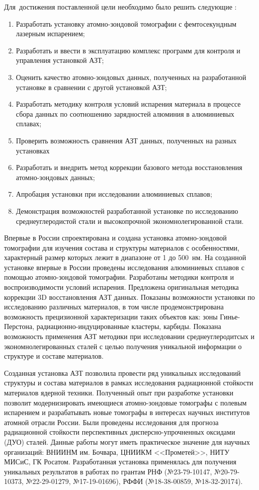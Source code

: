 Для~достижения поставленной цели необходимо было решить следующие {\tasks}:
\begin{enumerate}[beginpenalty=10000]
  \item Разработать установку атомно-зондовой томографии с фемтосекундным лазерным испарением;
  \item Разработать и ввести в эксплуатацию комплекс программ для контроля и управления установкой АЗТ;
  \item Оценить качество атомно-зондовых данных, полученных на разработанной установке в сравнении с другой установкой АЗТ;
  \item Разработать методику контроля условий испарения материала в процессе сбора данных по соотношению зарядностей алюминия в алюминиевых сплавах;
  \item Проверить возможность сравнения АЗТ данных, полученных на разных установках
  \item Разработать и внедрить метод коррекции базового метода восстановления атомно-зондовых данных;
  \item Апробация установки при исследовании алюминиевых сплавов;
  \item Демонстрация возможностей разработанной установке по исследованию среднеуглеродистой стали и высокопрочной экономнолегированной стали.
\end{enumerate}


{\novelty}
Впервые в России спроектирована и создана установка атомно-зондовой томографии для изучения состава и структуры материалов с особенностями, характерный размер которых лежит в диапазоне от 1 до 500~нм. На созданной установке впервые в России проведены исследования алюминиевых сплавов с помощью атомно-зондовой томографии. Разработаны методики контроля и воспроизводимости условий испарения. Предложена оригинальная методика коррекции 3D восстановления АЗТ данных. Показаны возможности установки по исследованию различных материалов, в том числе продемонстрирована возможность прецизионной характеризации таких объектов как: зоны Гинье-Перстона, радиационно-индуцированные кластеры, карбиды. Показана возможность применения АЗТ методики при исследовании среднеуглеродитсых и экономнолегированных сталей с целью получения уникальной информации о структуре и составе материалов.

{\influence} Созданная установка АЗТ позволила провести ряд уникальных исследований структуры и состава материалов в рамках исследования радиационной стойкости материалов ядерной техники. Полученный опыт при разработке установки позволит модернизировать имеющиеся атомно-зондовые томографы с полевым испарением и разрабатывать новые томографы в интересах научных институтов атомной отрасли России. Были проведены исследования для прогноза радиационной стойкости перспективных дисперсно-упрочненных оксидами (ДУО) сталей. Данные работы могут иметь практическое значение для научных организаций: ВНИИНМ им. Бочвара, ЦНИИКМ <<Прометей>>, НИТУ МИСиС, ГК Росатом. Разработанная установка применялась для получения уникальных результатов в работах по грантам РНФ (№23-79-10147, №20-79-10373, №22-29-01279, №17-19-01696), РФФИ (№18-38-00859, №18-32-20174).

